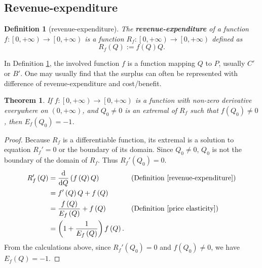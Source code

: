 \documentclass{article}
\newtheorem{theorem}{Theorem}[subsection]
\newtheorem{definition}{Definition}[subsection]
\begin{document}
\subsection{Revenue-expenditure}

\begin{definition}[revenue-expenditure]
\label{revenue-expenditure}
The \textbf{revenue-expenditure} of a function $f:\left[0,+\infty\right)\to\left[0,+\infty\right)$ is a function $R_f:\left[0,+\infty\right)\to\left[0,+\infty\right)$ defined as
$$R_f\left(Q\right):=f\left(Q\right)Q.$$
\end{definition}

In Definition \ref{revenue-expenditure}, the involved function $f$ is a function mapping $Q$ to $P$, usually $C'$ or $B'$.
One may usually find that the surplus can often be represented with difference of revenue-expenditure and cost/benefit.

\begin{theorem}
\label{price elasticity and revenue-expenditure}
If $f:\left[0,+\infty\right)\to\left[0,+\infty\right)$ is a function with non-zero derivative everywhere on $\left(0,+\infty\right)$, and $Q_0\ne0$ is an extremal of $R_f$ such that $f\left(Q_0\right)\ne0$, then $E_f\left(Q_0\right)=-1$.
\end{theorem}
\begin{proof}
Because $R_f$ is a differentiable function, its extremal is a solution to equation $R_f'=0$ or the boundary of its domain.
Since $Q_0\ne0$, $Q_0$ is{} not the boundary of the domain of $R_f$.
Thus $R_f'\left(Q_0\right)=0$.
\begin{align*}
R_f'\left(Q\right)&=\frac{\mathrm d}{\mathrm dQ}\left(f\left(Q\right)Q\right)&&\text{(Definition \ref{revenue-expenditure})}\\
&=f'\left(Q\right)Q+f\left(Q\right)\\
&=\frac{f\left(Q\right)}{E_f\left(Q\right)}+f\left(Q\right)&&\text{(Definition \ref{price elasticity})}\\
&=\left(1+\frac1{E_f\left(Q\right)}\right)f\left(Q\right).
\end{align*}
From the calculations above, since $R_f'\left(Q_0\right)=0$ and $f\left(Q_0\right)\ne0$, we have $E_f\left(Q\right)=-1$.
\end{proof}
\end{document}
